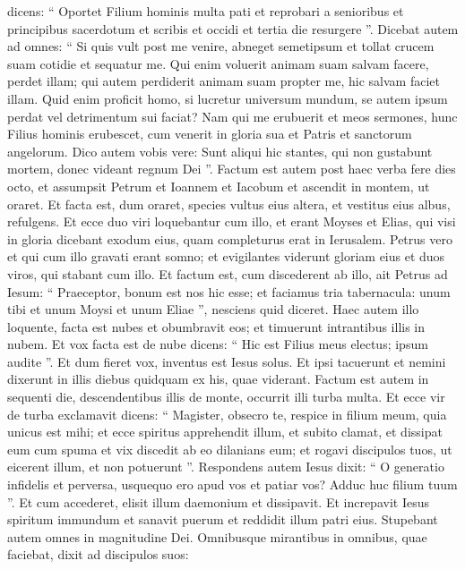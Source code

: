 \begin{biblechapter}
\begin{biblechapter}
\begin{biblechapter}
\begin{biblechapter}
\begin{biblechapter}
\begin{biblechapter}
\begin{biblechapter}
\begin{biblechapter}
\begin{biblechapter}
\verse dicens: “ Oportet Filium hominis multa pati et reprobari a senioribus et principibus sacerdotum et scribis et occidi et tertia die resurgere ”.
 \verse Dicebat autem ad omnes: “ Si quis vult post me venire, abneget semetipsum et tollat crucem suam cotidie et sequatur me. 
\verse Qui enim voluerit animam suam salvam facere, perdet illam; qui autem perdiderit animam suam propter me, hic salvam faciet illam. 
\verse Quid enim proficit homo, si lucretur universum mundum, se autem ipsum perdat vel detrimentum sui faciat? 
\verse Nam qui me erubuerit et meos sermones, hunc Filius hominis erubescet, cum venerit in gloria sua et Patris et sanctorum angelorum. 
\verse Dico autem vobis vere: Sunt aliqui hic stantes, qui non gustabunt mortem, donec videant regnum Dei ”.
 \verse Factum est autem post haec verba fere dies octo, et assumpsit Petrum et Ioannem et Iacobum et ascendit in montem, ut oraret. 
\verse Et facta est, dum oraret, species vultus eius altera, et vestitus eius albus, refulgens. 
\verse Et ecce duo viri loquebantur cum illo, et erant Moyses et Elias, 
\verse qui visi in gloria dicebant exodum eius, quam completurus erat in Ierusalem. 
\verse Petrus vero et qui cum illo gravati erant somno; et evigilantes viderunt gloriam eius et duos viros, qui stabant cum illo. 
\verse Et factum est, cum discederent ab illo, ait Petrus ad Iesum: “ Praeceptor, bonum est nos hic esse; et faciamus tria tabernacula: unum tibi et unum Moysi et unum Eliae ”, nesciens quid diceret. 
\verse Haec autem illo loquente, facta est nubes et obumbravit eos; et timuerunt intrantibus illis in nubem. 
\verse Et vox facta est de nube dicens: “ Hic est Filius meus electus; ipsum audite ”. 
\verse Et dum fieret vox, inventus est Iesus solus. Et ipsi tacuerunt et nemini dixerunt in illis diebus quidquam ex his, quae viderant.
 \verse Factum est autem in sequenti die, descendentibus illis de monte, occurrit illi turba multa. 
\verse Et ecce vir de turba exclamavit dicens: “ Magister, obsecro te, respice in filium meum, quia unicus est mihi; 
\verse et ecce spiritus apprehendit illum, et subito clamat, et dissipat eum cum spuma et vix discedit ab eo dilanians eum; 
\verse et rogavi discipulos tuos, ut eicerent illum, et non potuerunt ”. 
\verse Respondens autem Iesus dixit: “ O generatio infidelis et perversa, usquequo ero apud vos et patiar vos? Adduc huc filium tuum ”. 
\verse Et cum accederet, elisit illum daemonium et dissipavit. Et increpavit Iesus spiritum immundum et sanavit puerum et reddidit illum patri eius. 
\verse Stupebant autem omnes in magnitudine Dei.
 Omnibusque mirantibus in omnibus, quae faciebat, dixit ad discipulos suos: 

\end{biblechapter}
\end{biblechapter}
\end{biblechapter}
\end{biblechapter}
\end{biblechapter}
\end{biblechapter}
\end{biblechapter}
\end{biblechapter}
\end{biblechapter}
